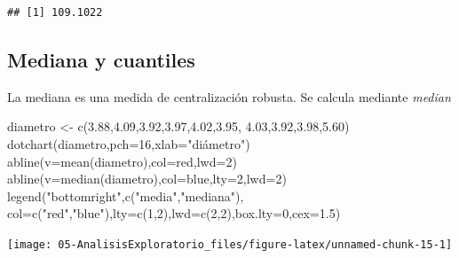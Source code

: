 \documentclass[
]{book}
\newenvironment{Shaded}{\begin{snugshade}}{\end{snugshade}}
\newcommand{\AttributeTok}[1]{\textcolor[rgb]{0.77,0.63,0.00}{#1}}
\newcommand{\DecValTok}[1]{\textcolor[rgb]{0.00,0.00,0.81}{#1}}
\newcommand{\FloatTok}[1]{\textcolor[rgb]{0.00,0.00,0.81}{#1}}
\newcommand{\FunctionTok}[1]{\textcolor[rgb]{0.00,0.00,0.00}{#1}}
\newcommand{\NormalTok}[1]{#1}
\newcommand{\OtherTok}[1]{\textcolor[rgb]{0.56,0.35,0.01}{#1}}
\newcommand{\StringTok}[1]{\textcolor[rgb]{0.31,0.60,0.02}{#1}}
\theoremstyle{break}
\begin{document}
\begin{verbatim}
## [1] 109.1022
\end{verbatim}

\hypertarget{mediana-y-cuantiles}{%
\subsection{Mediana y cuantiles}\label{mediana-y-cuantiles}}

La mediana es una medida de centralización robusta. Se calcula mediante \emph{median}

\begin{Shaded}
\begin{Highlighting}[]
\NormalTok{diametro }\OtherTok{\textless{}{-}} \FunctionTok{c}\NormalTok{(}\FloatTok{3.88}\NormalTok{,}\FloatTok{4.09}\NormalTok{,}\FloatTok{3.92}\NormalTok{,}\FloatTok{3.97}\NormalTok{,}\FloatTok{4.02}\NormalTok{,}\FloatTok{3.95}\NormalTok{, }\FloatTok{4.03}\NormalTok{,}\FloatTok{3.92}\NormalTok{,}\FloatTok{3.98}\NormalTok{,}\FloatTok{5.60}\NormalTok{)}
\FunctionTok{dotchart}\NormalTok{(diametro,}\AttributeTok{pch=}\DecValTok{16}\NormalTok{,}\AttributeTok{xlab=}\StringTok{"diámetro"}\NormalTok{)}
\FunctionTok{abline}\NormalTok{(}\AttributeTok{v=}\FunctionTok{mean}\NormalTok{(diametro),}\AttributeTok{col=}\StringTok{\textquotesingle{}red\textquotesingle{}}\NormalTok{,}\AttributeTok{lwd=}\DecValTok{2}\NormalTok{)}
\FunctionTok{abline}\NormalTok{(}\AttributeTok{v=}\FunctionTok{median}\NormalTok{(diametro),}\AttributeTok{col=}\StringTok{\textquotesingle{}blue\textquotesingle{}}\NormalTok{,}\AttributeTok{lty=}\DecValTok{2}\NormalTok{,}\AttributeTok{lwd=}\DecValTok{2}\NormalTok{)}
\FunctionTok{legend}\NormalTok{(}\StringTok{"bottomright"}\NormalTok{,}\FunctionTok{c}\NormalTok{(}\StringTok{"media"}\NormalTok{,}\StringTok{"mediana"}\NormalTok{),}
       \AttributeTok{col=}\FunctionTok{c}\NormalTok{(}\StringTok{"red"}\NormalTok{,}\StringTok{"blue"}\NormalTok{),}\AttributeTok{lty=}\FunctionTok{c}\NormalTok{(}\DecValTok{1}\NormalTok{,}\DecValTok{2}\NormalTok{),}\AttributeTok{lwd=}\FunctionTok{c}\NormalTok{(}\DecValTok{2}\NormalTok{,}\DecValTok{2}\NormalTok{),}\AttributeTok{box.lty=}\DecValTok{0}\NormalTok{,}\AttributeTok{cex=}\FloatTok{1.5}\NormalTok{)}
\end{Highlighting}
\end{Shaded}

\begin{center}\texttt{[image: 05-AnalisisExploratorio\_files/figure-latex/unnamed-chunk-15-1]} \end{center}
\end{document}
